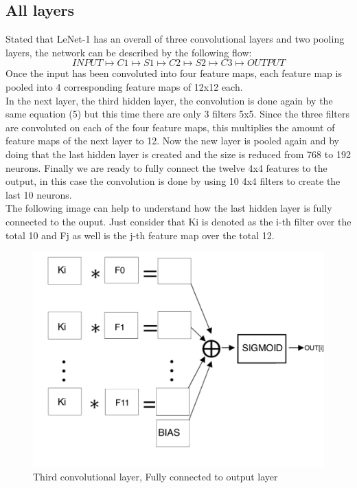 \documentclass[a4paper]{report}
\begin{document}
\subsection{All layers}
Stated that LeNet-1 has an overall of three convolutional layers and two pooling layers, the network can be described by the following flow:
\[ INPUT \mapsto C1 \mapsto S1 \mapsto C2 \mapsto S2 \mapsto C3 \mapsto OUTPUT \]
Once the input has been convoluted into four feature maps, each feature map is pooled into 4 corresponding feature maps of 12x12 each.\\
In the next layer, the third hidden layer, the convolution is done again by the same equation (5) but this time there are only 3 filters 5x5.
Since the three filters are convoluted on each of the four feature maps, this multiplies the amount of feature maps of the next layer to 12.
Now the new layer is pooled again and by doing that the last hidden layer is created and the size is reduced from 768 to 192 neurons.
Finally we are ready to fully connect the twelve 4x4 features to the output, in this case the convolution is done by using 10 4x4 filters to create the last 10 neurons.\\
The following image can help to understand how the last hidden layer is fully connected to the ouput.
Just consider that Ki is denoted as the i-th filter over the total 10 and Fj as well is the j-th feature map over the total 12. 

\begin{figure}[!h]
\centering
\includegraphics[scale=0.7]{docs/c3.png} 
\caption{Third convolutional layer, Fully connected to output layer}
\label{fig_c3}
\end{figure}
\end{document}
